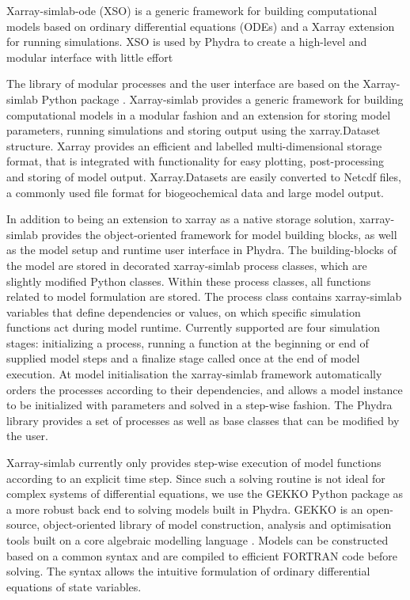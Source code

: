 \documentclass[journal abbreviation, manuscript]{copernicus}
\begin{document}
Xarray-simlab-ode (XSO) is a generic framework for building computational models based on ordinary differential equations (ODEs) and a Xarray extension for running simulations. XSO is used by Phydra to create a high-level and modular interface with little effort


The library of modular processes and the user interface are based on the Xarray-simlab Python package \citep{Bovy2018Xarray-simlab:Interactively}. Xarray-simlab provides a generic framework for building computational models in a modular fashion and an extension for storing model parameters, running simulations and storing output using the xarray.Dataset structure. Xarray provides an efficient and labelled multi-dimensional storage format, that is integrated with functionality for easy plotting, post-processing and storing of model output. Xarray.Datasets are easily converted to Netcdf files, a commonly used file format for biogeochemical data and large model output. 

In addition to being an extension to xarray as a native storage solution, xarray-simlab provides the object-oriented framework for model building blocks, as well as the model setup and runtime user interface in Phydra. The building-blocks of the model are stored in decorated xarray-simlab process classes, which are slightly modified Python classes. Within these process classes, all functions related to model formulation are stored. The process class contains xarray-simlab variables that define dependencies or values, on which specific simulation functions act during model runtime. Currently supported are four simulation stages: initializing a process, running a function at the beginning or end of supplied model steps and a finalize stage called once at the end of model execution. At model initialisation the xarray-simlab framework automatically orders the processes according to their dependencies, and allows a model instance to be initialized with parameters and solved in a step-wise fashion. The Phydra library provides a set of processes as well as base classes that can be modified by the user.

Xarray-simlab currently only provides step-wise execution of model functions according to an explicit time step. Since such a solving routine is not ideal for complex systems of differential equations, we use the GEKKO Python package as a more robust back end to solving models built in Phydra. GEKKO is an open-source, object-oriented library of model construction, analysis and optimisation tools built on a core algebraic modelling language \citep{Beal2018GEKKOSuite}. Models can be constructed based on a common syntax and are compiled to efficient FORTRAN code before solving. The syntax allows the intuitive formulation of ordinary differential equations of state variables.
\end{document}
